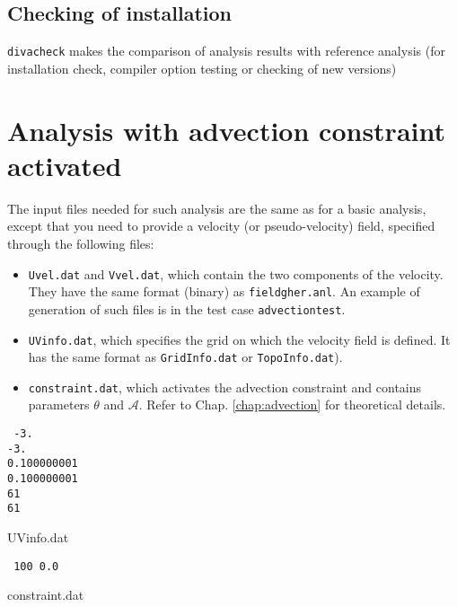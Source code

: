 \subsection{Checking of installation}

\texttt{divacheck} makes the comparison of analysis results with reference analysis (for
installation check, compiler option testing or checking of new versions)





\section{Analysis with advection constraint activated}

The input files needed for such analysis are the same as for a basic analysis, except that you need to provide a velocity (or pseudo-velocity) field, specified through the following files:
\begin{itemize}
\item {\tt Uvel.dat} and {\tt Vvel.dat}, which contain the two components of the velocity. They have the same format (binary) as {\tt fieldgher.anl}. An example of generation of such files is in the test case {\tt advectiontest}.
\item {\tt UVinfo.dat}, which specifies the grid on which the velocity field is defined. It has the same format as \texttt{GridInfo.dat} or \texttt{TopoInfo.dat}).
\item {\tt constraint.dat}, which activates the advection constraint and contains parameters $\theta$ and $\mathcal{A}$. Refer to Chap. \ref{chap:advection} for theoretical details.
\end{itemize}

\begin{exfile}[htpb]
\begin{footnotesize}
\texttt{
-3.\\
-3.\\
0.100000001\\
0.100000001\\
61\\
61
} 
\end{footnotesize}
\caption{UVinfo.dat\label{ex:UVinfo.dat}}
\end{exfile}


\begin{exfile}[htpb]
\begin{footnotesize}
\texttt{
100 0.0
} 
\end{footnotesize}
\caption{constraint.dat\label{ex:constraint.dat}}
\end{exfile}

